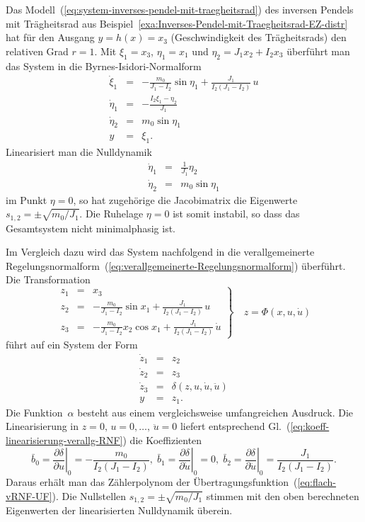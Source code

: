 \begin{example}
Das Modell~(\ref{eq:system-inverses-pendel-mit-traegheitsrad}) des
inversen Pendels mit Trägheitsrad aus Beispiel~\ref{exa:Inverses-Pendel-mit-Traegheitsrad-EZ-distr}
hat für den Ausgang $y=h(x)=x_{3}$ (Geschwindigkeit des Trägheitsrads)
den relativen Grad $r=1$. Mit $\xi_{1}=x_{3}$, $\eta_{1}=x_{1}$
und $\eta_{2}=J_{1}x_{2}+I_{2}x_{3}$ überführt man das System in
die Byrnes-Isidori-Normalform 
\[
\begin{array}{lcl}
\dot{\xi}_{1} & = & -\frac{m_{0}}{J_{1}-I_{2}}\sin\eta_{1}+\frac{J_{1}}{I_{2}(J_{1}-I_{2})}\,u\\
\dot{\eta}_{1} & = & -\frac{I_{2}\xi_{1}-\eta_{2}}{J_{1}}\\
\dot{\eta}_{2} & = & m_{0}\sin\eta_{1}\\
y & = & \xi_{1}.
\end{array}
\]
Linearisiert man die Nulldynamik
\[
\begin{array}{lcl}
\dot{\eta}_{1} & = & \frac{1}{J_{1}}\eta_{2}\\
\dot{\eta}_{2} & = & m_{0}\sin\eta_{1}
\end{array}
\]
im Punkt $\eta=0$, so hat zugehörige die Jacobimatrix die Eigenwerte
$s_{1,2}=\pm\sqrt{m_{0}/J_{1}}$. Die Ruhelage $\eta=0$ ist somit
instabil, so dass das Gesamtsystem nicht minimalphasig ist.

Im Vergleich dazu wird das System nachfolgend in die verallgemeinerte
Regelungsnormalform~(\ref{eq:verallgemeinerte-Regelungsnormalform})
überführt. Die Transformation 
\[
\left.\begin{array}{lcl}
z_{1} & = & x_{3}\\
z_{2} & = & -\frac{m_{0}}{J_{1}-I_{2}}\sin x_{1}+\frac{J_{1}}{I_{2}(J_{1}-I_{2})}\,u\\
z_{3} & = & -\frac{m_{0}}{J_{1}-I_{2}}x_{2}\cos x_{1}+\frac{J_{1}}{I_{2}(J_{1}-I_{2})}\,\dot{u}
\end{array}\right\} \quad z=\Phi(x,u,\dot{u})
\]
führt auf ein System der Form
\[
\begin{array}{lcl}
\dot{z}_{1} & = & z_{2}\\
\dot{z}_{2} & = & z_{3}\\
\dot{z}_{3} & = & \delta(z,u,\dot{u},\ddot{u})\\
y & = & z_{1}.
\end{array}
\]
Die Funktion~$\alpha$ besteht aus einem vergleichsweise umfangreichen
Ausdruck. Die Linearisierung in $z=0,\,u=0,\ldots,\,\ddot{u}=0$ liefert
entsprechend Gl.~(\ref{eq:koeff-linearisierung-verallg-RNF}) die
Koeffizienten
\[
\bar{b}_{0}=\left.\frac{\partial\delta}{\partial u}\right|_{0}=-\frac{m_{0}}{I_{2}(J_{1}-I_{2})},\;\bar{b}_{1}=\left.\frac{\partial\delta}{\partial\dot{u}}\right|_{0}=0,\;\bar{b}_{2}=\left.\frac{\partial\delta}{\partial\ddot{u}}\right|_{0}=\frac{J_{1}}{I_{2}(J_{1}-I_{2})}.
\]
Daraus erhält man das Zählerpolynom der Übertragungsfunktion~(\ref{eq:flach-vRNF-UF}).
Die Nullstellen $s_{1,2}=\pm\sqrt{m_{0}/J_{1}}$ stimmen mit den oben
berechneten Eigenwerten der linearisierten Nulldynamik überein.
\end{example}

